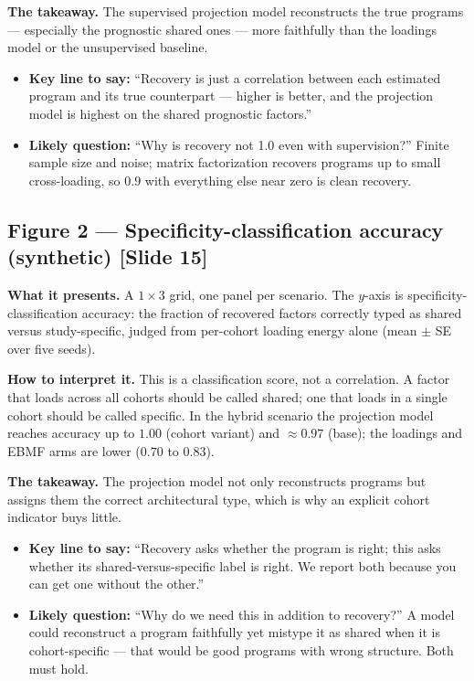 \documentclass[11pt]{article}
\newcommand{\sectionlabel}[1]{\textbf{#1}}
\begin{document}
\sectionlabel{The takeaway.} The supervised projection model reconstructs the true programs ---
especially the prognostic shared ones --- more faithfully than the loadings model or the
unsupervised baseline.

\begin{itemize}
\item \sectionlabel{Key line to say:} ``Recovery is just a correlation between each estimated program
and its true counterpart --- higher is better, and the projection model is highest on the shared
prognostic factors.''
\item \sectionlabel{Likely question:} ``Why is recovery not 1.0 even with supervision?'' Finite
sample size and noise; matrix factorization recovers programs up to small cross-loading, so $0.9$
with everything else near zero is clean recovery.
\end{itemize}

\subsection*{Figure 2 --- Specificity-classification accuracy (synthetic) [Slide 15]}
\sectionlabel{What it presents.} A $1 \times 3$ grid, one panel per scenario. The $y$-axis is
specificity-classification accuracy: the fraction of recovered factors correctly typed as shared
versus study-specific, judged from per-cohort loading energy alone (mean $\pm$ SE over five seeds).

\sectionlabel{How to interpret it.} This is a classification score, not a correlation. A factor that
loads across all cohorts should be called shared; one that loads in a single cohort should be called
specific. In the hybrid scenario the projection model reaches accuracy up to $1.00$ (cohort variant)
and $\approx 0.97$ (base); the loadings and EBMF arms are lower ($0.70$ to $0.83$).

\sectionlabel{The takeaway.} The projection model not only reconstructs programs but assigns them the
correct architectural type, which is why an explicit cohort indicator buys little.

\begin{itemize}
\item \sectionlabel{Key line to say:} ``Recovery asks whether the program is right; this asks whether
its shared-versus-specific label is right. We report both because you can get one without the other.''
\item \sectionlabel{Likely question:} ``Why do we need this in addition to recovery?'' A model could
reconstruct a program faithfully yet mistype it as shared when it is cohort-specific --- that would
be good programs with wrong structure. Both must hold.
\end{itemize}
\end{document}
